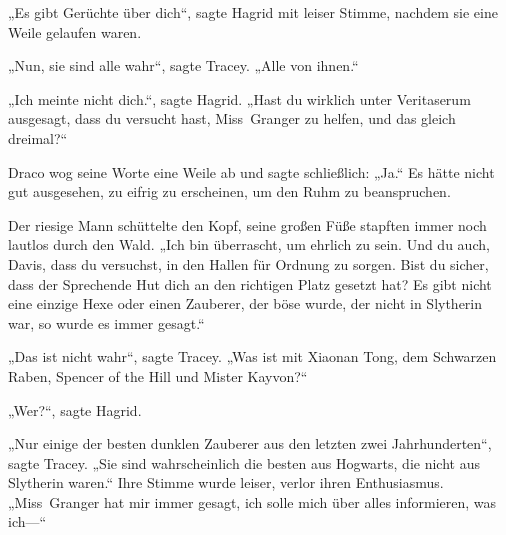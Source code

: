 „Es gibt Gerüchte über dich“, sagte Hagrid mit leiser Stimme, nachdem sie eine Weile gelaufen waren.

„Nun, sie sind alle wahr“, sagte Tracey. „Alle von ihnen.“

„Ich meinte nicht dich.“, sagte Hagrid. „Hast du wirklich unter Veritaserum ausgesagt, dass du versucht hast, Miss~Granger zu helfen, und das gleich dreimal?“

Draco wog seine Worte eine Weile ab und sagte schließlich: „Ja.“
Es hätte nicht gut ausgesehen, zu eifrig zu erscheinen, um den Ruhm zu beanspruchen.

Der riesige Mann schüttelte den Kopf, seine großen Füße stapften immer noch lautlos durch den Wald. „Ich bin überrascht, um ehrlich zu sein. Und du auch, Davis, dass du versuchst, in den Hallen für Ordnung zu sorgen. Bist du sicher, dass der Sprechende Hut dich an den richtigen Platz gesetzt hat? Es gibt nicht eine einzige Hexe oder einen Zauberer, der böse wurde, der nicht in Slytherin war, so wurde es immer gesagt.“

„Das ist nicht wahr“, sagte Tracey. „Was ist mit Xiaonan Tong, dem Schwarzen Raben, Spencer of the Hill und Mister Kayvon?“

„Wer?“, sagte Hagrid.

„Nur einige der besten dunklen Zauberer aus den letzten zwei Jahrhunderten“, sagte Tracey. „Sie sind wahrscheinlich die besten aus Hogwarts, die nicht aus Slytherin waren.“ Ihre Stimme wurde leiser, verlor ihren Enthusiasmus. „Miss~Granger hat mir immer gesagt, ich solle mich über alles informieren, was ich—“

